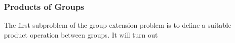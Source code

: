 

\subsubsection{Products of Groups}
The first subproblem of the group extension problem is to define a suitable product operation between groups. It will turn out





